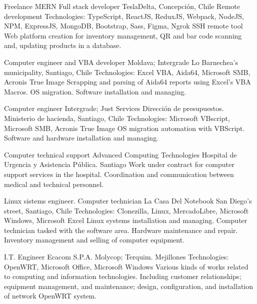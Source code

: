 \documentclass[draft,color,12pt,letterpaper,sans]{moderncv}
\begin{document}
{Freelance MERN Full stack developer}
{TeslaDelta, Concepci\'on, Chile}
{\newline Remote development}
{\newline Technologies: TypeScript, ReactJS, ReduxJS, Webpack, NodeJS, NPM, ExpressJS, MongoDB, Bootstrap, Sass, Figma, Ngrok SSH remote tool}
{Web platform creation for inventory management, QR and bar code scanning and, updating products in a database.\newline}

{Computer engineer and VBA developer}
{Moldava; Intergrade}
{Lo Barnechea's municipality, Santiago, Chile}
{\newline Technologies: Excel VBA, Aida64, Microsoft SMB, Acronis True Image}
{Scrapping and parsing of Aida64 reports using Excel's VBA Macros. OS migration. Software installation and managing.\newline}


{Computer engineer}
{Intergrade; Just Services}
{Direcci\'on de presupuestos. Ministerio de hacienda, Santiago, Chile}
{\newline Technologies: Microsoft VBscript, Microsoft SMB, Acronis True Image}
{OS migration automation with VBScript. Software and hardware installation and managing.\newline}

{Computer technical support}
{Advanced Computing Technologies}
{Hospital de Urgencia y Asistencia P\'ublica. Santiago}
{}
{Work under contract for computer support services in the hospital. Coordination and communication between medical and technical personnel.\newline}

{Linux sistems engineer. Computer technician}
{La Casa Del Notebook}
{San Diego's street, Santiago, Chile}
{\newline Technologies: Clonezilla, Linux, MercadoLibre, Microsoft Windows, Microsoft Excel}
{Linux systems installation and managing. Computer technician tasked with the software area. Hardware maintenance and repair. Inventory management and selling of computer equipment.\newline} 

{I.T. Engineer}
{Ecacom S.P.A.}
{Molycop; Terquim. Mejillones}
{\newline Technologies: OpenWRT, Microsoft Office, Microsoft Windows}
{Various kinds of works related to computing and information technologies. Including customer relationships; equipment management, and maintenance; design, configuration, and installation of network OpenWRT system.\newline}
\end{document}
